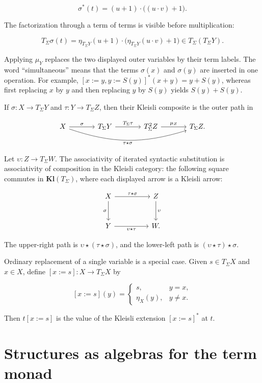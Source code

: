 \documentclass[11pt]{article}
\theoremstyle{definition}
\begin{document}
\[
\sigma^*(t)=(u+1)\cdot\bigl((u\cdot v)+1\bigr).
\]

The factorization through a term of terms is visible before multiplication:

\[
T_\Sigma\sigma(t)
=\eta_{T_\Sigma Y}(u+1)\cdot
 \bigl(\eta_{T_\Sigma Y}(u\cdot v)+1\bigr)
\in T_\Sigma(T_\Sigma Y).
\]

Applying \(\mu_Y\) replaces the two displayed outer variables by their term
labels. The word ``simultaneous'' means that the terms \(\sigma(x)\) and
\(\sigma(y)\) are inserted in one operation. For example,
\([x:=y,y:=S(y)]^*(x+y)=y+S(y)\), whereas first replacing \(x\) by \(y\)
and then replacing \(y\) by \(S(y)\) yields \(S(y)+S(y)\).

If \(\sigma:X\to T_\Sigma Y\) and \(\tau:Y\to T_\Sigma Z\), then their
Kleisli composite is the outer path in

\[
\begin{tikzcd}[column sep=large]
X \arrow[r,"\sigma"]
  \arrow[rrr,bend right=18,"\tau\star\sigma"'] &
T_\Sigma Y \arrow[r,"T_\Sigma\tau"] &
T_\Sigma^2Z \arrow[r,"\mu_Z"] &
T_\Sigma Z.
\end{tikzcd}
\]

Let \(\upsilon:Z\to T_\Sigma W\). The associativity of iterated syntactic
substitution is associativity of composition in the Kleisli category: the following
square commutes in \(\mathbf{Kl}(T_\Sigma)\), where each displayed arrow is a
Kleisli arrow:

\[
\begin{tikzcd}[row sep=large,column sep=huge]
X \arrow[r,"\tau\star\sigma"] \arrow[d,"\sigma"'] &
Z \arrow[d,"\upsilon"] \\
Y \arrow[r,"\upsilon\star\tau"'] & W.
\end{tikzcd}
\]

The upper-right path is \(\upsilon\star(\tau\star\sigma)\), and the
lower-left path is \((\upsilon\star\tau)\star\sigma\).

Ordinary replacement of a single variable is a special case. Given
\(s\in T_\Sigma X\) and \(x\in X\), define
\([x:=s]:X\to T_\Sigma X\) by

\[
[x:=s](y)=
\begin{cases}
s,&y=x,\\
\eta_X(y),&y\ne x.
\end{cases}
\]

Then \(t[x:=s]\) is the value of the Kleisli extension \([x:=s]^*\) at
\(t\).

\section{Structures as algebras for the term
monad}\label{structures-as-algebras-for-the-term-monad}
\end{document}
